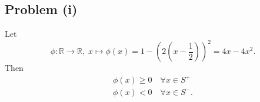 \subsection*{Problem (i)}

Let 
\[
\phi:\mathbb{R}\rightarrow\mathbb{R},\; x\mapsto\phi(x)=1-\left(2\left(x-\frac{1}{2}\right)\right)^{2}=4x-4x^{2}.
\]
Then
\[
\begin{gathered}\phi(x)\geq0\quad\forall x\in S^{+}\\
\phi(x)<0\quad\forall x\in S^{-}.
\end{gathered}
\]
